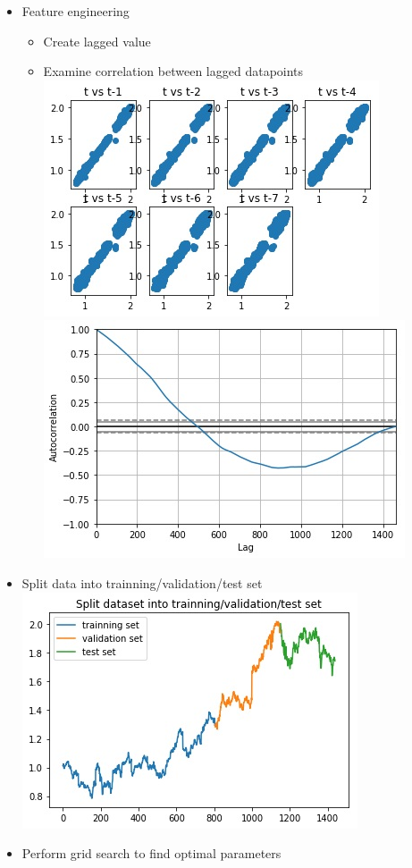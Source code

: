 \documentclass[11pt]{article}
\makeatletter
\def\maxwidth{\ifdim\Gin@nat@width>\linewidth\linewidth
    \else\Gin@nat@width\fi}
\let\Oldincludegraphics\includegraphics
\renewcommand{\includegraphics}[1]{\Oldincludegraphics[width=.8\maxwidth]{#1}}
\providecommand{\tightlist}{%
      \setlength{\itemsep}{0pt}\setlength{\parskip}{0pt}}
\makeatother
\begin{document}
\begin{itemize}
\item
  Feature engineering

  \begin{itemize}
  \tightlist
  \item
    Create lagged value
  \item
    Examine correlation between lagged datapoints\\
    \includegraphics{./figures/5.jpg} \includegraphics{./figures/6.jpg}
  \end{itemize}
\item
  Split data into trainning/validation/test set\\
  \includegraphics{./figures/7.jpg}
\item
  Perform grid search to find optimal parameters


\end{itemize}
\end{document}
